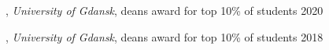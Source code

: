 \documentclass[letter,10pt]{article}
\begin{document}
, \textit{University of Gdansk}, deans award for top 10\% of students	\hfill 2020 

, \textit{University of Gdansk}, deans award for top 10\% of students \hfill 2018
\end{document}
